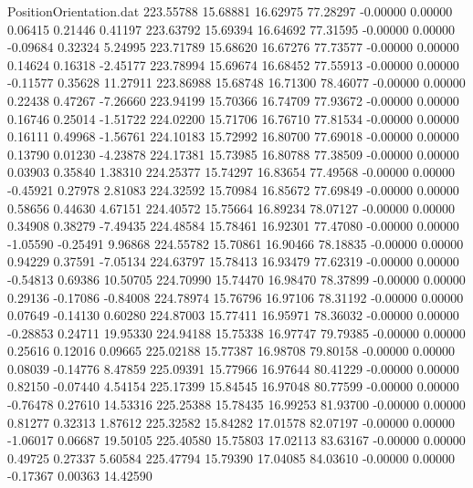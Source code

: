 \begin{filecontents}{PositionOrientation.dat}
 223.55788   15.68881   16.62975    77.28297   -0.00000    0.00000    0.06415    0.21446    0.41197
 223.63792   15.69394   16.64692    77.31595   -0.00000    0.00000   -0.09684    0.32324    5.24995
 223.71789   15.68620   16.67276    77.73577   -0.00000    0.00000    0.14624    0.16318   -2.45177
 223.78994   15.69674   16.68452    77.55913   -0.00000    0.00000   -0.11577    0.35628   11.27911
 223.86988   15.68748   16.71300    78.46077   -0.00000    0.00000    0.22438    0.47267   -7.26660
 223.94199   15.70366   16.74709    77.93672   -0.00000    0.00000    0.16746    0.25014   -1.51722
 224.02200   15.71706   16.76710    77.81534   -0.00000    0.00000    0.16111    0.49968   -1.56761
 224.10183   15.72992   16.80700    77.69018   -0.00000    0.00000    0.13790    0.01230   -4.23878
 224.17381   15.73985   16.80788    77.38509   -0.00000    0.00000    0.03903    0.35840    1.38310
 224.25377   15.74297   16.83654    77.49568   -0.00000    0.00000   -0.45921    0.27978    2.81083
 224.32592   15.70984   16.85672    77.69849   -0.00000    0.00000    0.58656    0.44630    4.67151
 224.40572   15.75664   16.89234    78.07127   -0.00000    0.00000    0.34908    0.38279   -7.49435
 224.48584   15.78461   16.92301    77.47080   -0.00000    0.00000   -1.05590   -0.25491    9.96868
 224.55782   15.70861   16.90466    78.18835   -0.00000    0.00000    0.94229    0.37591   -7.05134
 224.63797   15.78413   16.93479    77.62319   -0.00000    0.00000   -0.54813    0.69386   10.50705
 224.70990   15.74470   16.98470    78.37899   -0.00000    0.00000    0.29136   -0.17086   -0.84008
 224.78974   15.76796   16.97106    78.31192   -0.00000    0.00000    0.07649   -0.14130    0.60280
 224.87003   15.77411   16.95971    78.36032   -0.00000    0.00000   -0.28853    0.24711   19.95330
 224.94188   15.75338   16.97747    79.79385   -0.00000    0.00000    0.25616    0.12016    0.09665
 225.02188   15.77387   16.98708    79.80158   -0.00000    0.00000    0.08039   -0.14776    8.47859
 225.09391   15.77966   16.97644    80.41229   -0.00000    0.00000    0.82150   -0.07440    4.54154
 225.17399   15.84545   16.97048    80.77599   -0.00000    0.00000   -0.76478    0.27610   14.53316
 225.25388   15.78435   16.99253    81.93700   -0.00000    0.00000    0.81277    0.32313    1.87612
 225.32582   15.84282   17.01578    82.07197   -0.00000    0.00000   -1.06017    0.06687   19.50105
 225.40580   15.75803   17.02113    83.63167   -0.00000    0.00000    0.49725    0.27337    5.60584
 225.47794   15.79390   17.04085    84.03610   -0.00000    0.00000   -0.17367    0.00363   14.42590

\end{filecontents}
